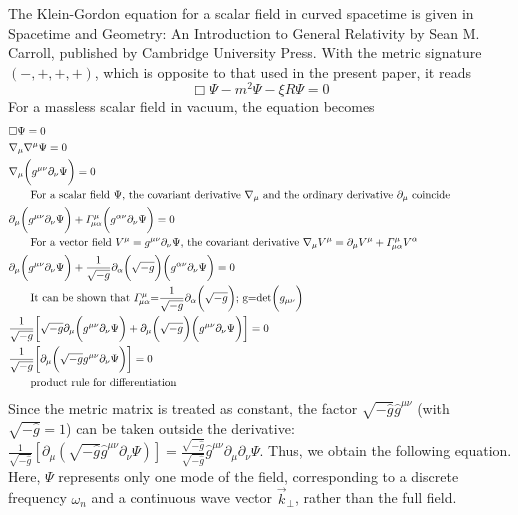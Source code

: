 \documentclass[english]{article}
\begin{document}
The Klein-Gordon equation for a scalar field in curved spacetime is
given in Spacetime and Geometry: An Introduction to General Relativity
by Sean M. Carroll, published by Cambridge University Press. With
the metric signature $(-,+,+,+)$, which is opposite to that used
in the present paper, it reads 
\[
\Box\Psi-m^{2}\Psi-\xi R\Psi=0
\]
 For a massless scalar field in vacuum, the equation becomes 
\begin{align*}
 & \Box\Psi=0\\
 & \nabla_{\mu}\nabla^{\mu}\Psi=0\\
 & \nabla_{\mu}\biggl(g^{\mu\nu}\partial_{\nu}\Psi\biggr)=0\\
 & \qquad\text{\parbox{155mm}{For a scalar field \ensuremath{\Psi}, the covariant derivative \ensuremath{\nabla_{\mu}} and the ordinary derivative \ensuremath{\partial_{\mu}} coincide}}\\
 & \partial_{\mu}\biggl(g^{\mu\nu}\partial_{\nu}\Psi\biggr)+\varGamma^{\mu}_{\!\mu\alpha}\biggl(g^{\alpha\nu}\partial_{\nu}\Psi\biggr)=0\\
 & \qquad\text{\parbox{155mm}{For a vector field \ensuremath{V^{\mu}=g^{\mu\nu}\partial_{\nu}\Psi}, the covariant derivative \ensuremath{\nabla_{\mu}V^{\mu}=\partial_{\mu}V^{\mu}+\varGamma^{\mu}_{\!\mu\alpha}V^{\alpha}}}}\\
 & \partial_{\mu}\biggl(g^{\mu\nu}\partial_{\nu}\Psi\biggr)+\frac{1}{\sqrt{-g}}\partial_{\alpha}\biggl(\sqrt{-g}\biggr)\biggl(g^{\alpha\nu}\partial_{\nu}\Psi\biggr)=0\\
 & \qquad\text{\parbox{155mm}{It can be shown that \ensuremath{\varGamma^{\mu}_{\!\mu\alpha}}=\ensuremath{\frac{1}{\sqrt{-g}}\partial_{\alpha}\biggl(\sqrt{-g}\biggr)}; g=\ensuremath{\det\biggl(g_{\mu\nu}\biggr)}}}\\
 & \frac{1}{\sqrt{-g}}\biggl[\sqrt{-g}\partial_{\mu}\biggl(g^{\mu\nu}\partial_{\nu}\Psi\biggr)+\partial_{\mu}\biggl(\sqrt{-g}\biggr)\biggl(g^{\mu\nu}\partial_{\nu}\Psi\biggr)\biggr]=0\\
 & \frac{1}{\sqrt{-g}}\biggl[\partial_{\mu}\biggl(\sqrt{-g}g^{\mu\nu}\partial_{\nu}\Psi\biggr)\biggr]=0\\
 & \qquad\text{\parbox{155mm}{product rule for differentiation}}
\end{align*}
 Since the metric matrix is treated as constant, the factor $\sqrt{-\hat{g}}\hat{g}^{\mu\nu}$
(with $\sqrt{-\hat{g}}=1$) can be taken outside the derivative: $\frac{1}{\sqrt{-\hat{g}}}\left[\partial_{\mu}\left(\sqrt{-\hat{g}}\hat{g}^{\mu\nu}\partial_{\nu}\Psi\right)\right]=\frac{\sqrt{-\hat{g}}}{\sqrt{-\hat{g}}}\hat{g}^{\mu\nu}\partial_{\mu}\partial_{\nu}\Psi$.
Thus, we obtain the following equation. Here, $\Psi$ represents only
one mode of the field, corresponding to a discrete frequency $\omega_{n}$
and a continuous wave vector $\ensuremath{\vec{k}_{\perp}}$, rather
than the full field.
\end{document}
